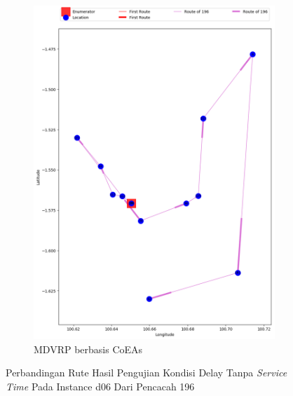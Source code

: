 \begin{figure}[H]
	\centering
	\begin{subfigure}[t]{\textwidth}
		\centering
		\includegraphics[width=\textwidth]{Resources/Images/delayed_6/real_m15_n100_delayed_6_196_coes}
		\caption{MDVRP berbasis CoEAs}
		\label{fig:real_m15_n100_delayed_6_196_coes}
	\end{subfigure}
	\caption{Perbandingan Rute Hasil Pengujian Kondisi Delay Tanpa \textit{Service Time} Pada Instance d06 Dari Pencacah 196}
	\label{fig:real_m15_n100_delayed_6_196}
\end{figure}


